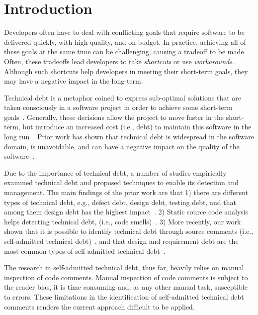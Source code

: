 \documentclass{sig-alternate}
\newcommand{\SATD}{self-admitted technical debt\xspace}
\begin{document}
\terms{}

\keywords{}

\section{Introduction}
\label{sec:introduction}
Developers often have to deal with conflicting goals that require software to be delivered quickly, with high quality, and on budget. In practice, achieving all of these goals at the same time can be challenging, causing a tradeoff to be made. Often, these tradeoffs lead developers to take \emph{shortcuts} or use \emph{workarounds}. Although such shortcuts help developers in meeting their short-term goals, they may have a negative impact in the long-term.

Technical debt is a metaphor coined to express sub-optimal solutions that are taken consciously in a software project in order to achieve some short-term goals~\cite{Cunningham1992WPM}. Generally, these decisions allow the project to move faster in the short-term, but introduce an increased cost (i.e., debt) to maintain this software in the long run~\cite{Seaman2011,Kruchten2013IWMTD}. Prior work has shown that technical debt is widespread in the software domain, is unavoidable, and can have a negative impact on the quality of the software~\cite{Lim2012Software}.

Due to the importance of technical debt, a number of studies empirically examined technical debt and proposed techniques to enable its detection and management. The main findings of the prior work are that 1) there are different types of technical debt, e.g., defect debt, design debt, testing debt, and that among them design debt has the highest impact~\cite{Alves2014MTD,Marinescu2012IBM}. 2) Static source code analysis helps detecting technical debt, (i.e., code smells)~\cite{Marinescu2004ICSM,Marinescu2010CSMR,Zazworka2013CSE}. 3) More recently, our work shown that it is possible to identify technical debt through source comments (i.e., \SATD)~\cite{Potdar2014ICSME}, and that design and requirement debt are the most common types of \SATD~\cite{Maldonado2015MTD}.

The research in \SATD, thus far, heavily relies on manual inspection of code comments. Manual inspection of code comments is subject to the reader bias, it is time consuming and, as any other manual task, susceptible to errors. These limitations in the identification of \SATD comments renders the current approach difficult to be applied.
\end{document}
